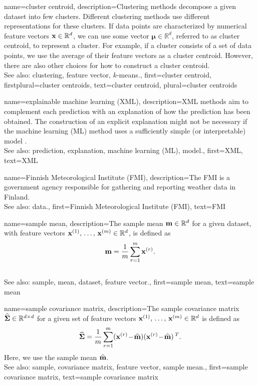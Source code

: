 {
{name={cluster centroid}, 
	description={Clustering methods decompose a given 
		dataset into few clusters. Different clustering methods use 
		different representations for these clusters. If data points are 
		characterized by numerical feature vectors ${\bf x} \in \mathbb{R}^{d}$, 
		we can use some vector ${\bm \mu} \in \mathbb{R}^{d}$, referred to 
		as cluster centroid, to represent a cluster. For example, if a cluster 
		consists of a set of data points, we use the average of their feature vectors 
		as a cluster centroid. However, there are also other choices for how to construct a cluster centroid. 
		\\
		See also: clustering, feature vector, $k$-means.},
	first={cluster centroid},
	firstplural={cluster centroids}, 
	text={cluster centroid}, 
	plural={cluster centroids}
}


{name={explainable machine learning (XML)}, 
	description={XML 
		methods aim to complement each prediction with an explanation of 
		how the prediction has been obtained. The construction of an explicit explanation 
		might not be necessary if the machine learning (ML) method uses a sufficiently simple (or interpretable) model \cite{rudin2019stop}.
				\\
		See also: prediction, explanation, machine learning (ML), model.},
	first={XML},
	text={XML} 
}

{name={Finnish Meteorological Institute (FMI)}, 
	description={The
		FMI is a government agency responsible for gathering 
		and reporting weather data in Finland.
				\\
		See also: data.},
	first={Finnish Meteorological Institute (FMI)},
	text={FMI} 
}
	
	
{name={sample mean}, 
	description={The sample mean 
		${\bf m} \in \mathbb{R}^{d}$ for a given dataset, with feature vectors 
		${\bf x}^{(1)}, \,\ldots, \,{\bf x}^{(m)} \in \mathbb{R}^{d}$, is defined as 
		$${\bf m} = \frac{1}{m} \sum_{r=1}^{m} {\bf x}^{(r)}.$$ 
					\\
		See also: sample, mean, dataset, feature vector.},
	first={sample mean},
	text={sample mean} 
}

	
{name={sample covariance matrix}, 
	description={The 
		sample covariance matrix $\widehat{\bf \Sigma} \in \mathbb{R}^{d \times d}$ 
		for a given set of feature vectors ${\bf x}^{(1)}, \,\ldots, \,{\bf x}^{(m)} \in \mathbb{R}^{d}$ is defined as 
		$$\widehat{\bf \Sigma} = \frac{1}{m} \sum_{r=1}^{m} ({\bf x}^{(r)}\!-\!\widehat{{\bf m}}) ({\bf x}^{(r)}\!-\!\widehat{{\bf m}})\,^{T}.$$ 
		Here, we use the sample mean $\widehat{{\bf m}}$. 
				\\
		See also: sample, covariance matrix, feature vector, sample mean.},
	first={sample covariance matrix},
	text={sample covariance matrix} 
}

}
